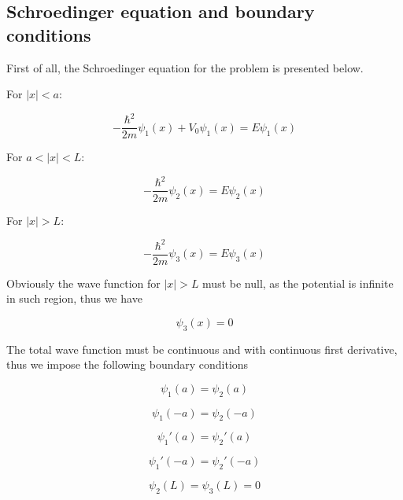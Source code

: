 \documentclass{article}
\begin{document}
\subsection{Schroedinger equation and boundary conditions}
First of all, the Schroedinger equation for the problem is presented below.

For \(\left|x\right| < a\):

\begin{equation}
\label{eq:schr1}
-\frac{\hbar^2}{2m}\psi_{1}(x) + V_{0}\psi_{1}(x) = E\psi_{1}(x)
\end{equation}

For \(a < \left|x\right| < L\):

\begin{equation}
\label{eq:schr2}
-\frac{\hbar^2}{2m}\psi_{2}(x) = E\psi_{2}(x)
\end{equation}

For \(\left|x\right| > L\):

\begin{equation}
\label{eq:schr3}
-\frac{\hbar^2}{2m}\psi_{3}(x) = E\psi_{3}(x)
\end{equation}

Obviously the wave function for \(\left|x\right| > L\) must be null, as the potential is infinite in such region, thus we have

\begin{equation}
\psi_{3}(x) = 0
\end{equation}

The total wave function must be continuous and with continuous first derivative, thus we impose the following boundary conditions

\begin{equation}
\label{eq:continuity}
\psi_{1}(a) =  \psi_{2}(a)
\end{equation}

\begin{equation}
\psi_{1}(-a) =  \psi_{2}(-a)
\end{equation}

\begin{equation}
\label{eq:continuity_derivative}
\psi_{1}'(a) =  \psi_{2}'(a)
\end{equation}

\begin{equation}
\psi_{1}'(-a) =  \psi_{2}'(-a)
\end{equation}

\begin{equation}
\label{eq:null_bound}
\psi_{2}(L) =  \psi_{3}(L) = 0
\end{equation}
\end{document}
